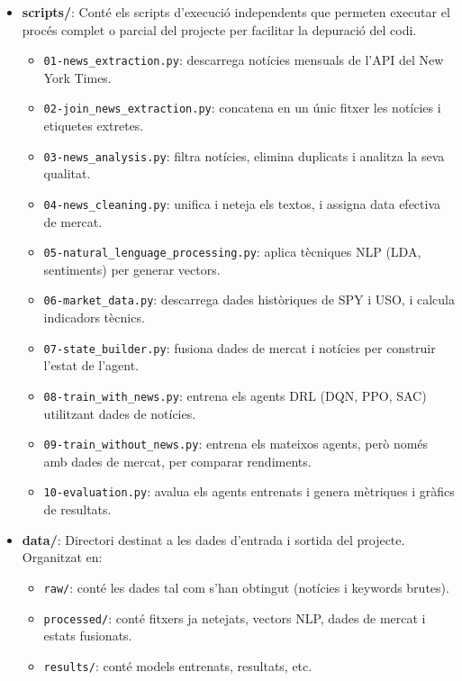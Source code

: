 \documentclass[12pt,a4paper,twoside]{book}
\begin{document}
\begin{itemize}
    \item \textbf{scripts/}: Conté els scripts d'execució independents que permeten executar el procés complet o parcial del projecte per facilitar la depuració del codi.
    \begin{itemize}
        \item \texttt{01-news\_extraction.py}: descarrega notícies mensuals de l'API del New York Times.
        \item \texttt{02-join\_news\_extraction.py}: concatena en un únic fitxer les notícies i etiquetes extretes.
        \item \texttt{03-news\_analysis.py}: filtra notícies, elimina duplicats i analitza la seva qualitat.
        \item \texttt{04-news\_cleaning.py}: unifica i neteja els textos, i assigna data efectiva de mercat.
        \item \texttt{05-natural\_lenguage\_processing.py}: aplica tècniques NLP (LDA, sentiments) per generar vectors.
        \item \texttt{06-market\_data.py}: descarrega dades històriques de SPY i USO, i calcula indicadors tècnics.
        \item \texttt{07-state\_builder.py}: fusiona dades de mercat i notícies per construir l'estat de l'agent.
        \item \texttt{08-train\_with\_news.py}: entrena els agents DRL (DQN, PPO, SAC) utilitzant dades de notícies.
        \item \texttt{09-train\_without\_news.py}: entrena els mateixos agents, però només amb dades de mercat, per comparar rendiments.
        \item \texttt{10-evaluation.py}: avalua els agents entrenats i genera mètriques i gràfics de resultats.
    \end{itemize}

    \item \textbf{data/}: Directori destinat a les dades d'entrada i sortida del projecte. Organitzat en:
    \begin{itemize}
        \item \texttt{raw/}: conté les dades tal com s'han obtingut (notícies i keywords brutes).
        \item \texttt{processed/}: conté fitxers ja netejats, vectors NLP, dades de mercat i estats fusionats.
        \item \texttt{results/}: conté models entrenats, resultats, etc.
    \end{itemize}


\end{itemize}
\end{document}
